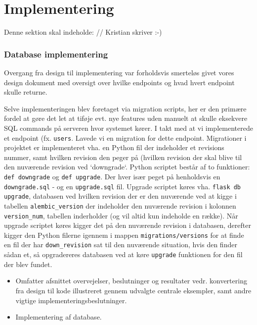 \section{Implementering}
Denne sektion skal indeholde:
// Kristian skriver :-)

\subsubsection{Database implementering}
Overgang fra design til implementering var forholdsvis smerteløs givet vores design dokument med oversigt over hvilke endpoints og hvad hvert endpoint skulle returne.

Selve implementeringen blev foretaget via migration scripts, her er den primære fordel at gøre det let at tiføje evt. nye features uden manuelt at skulle eksekvere SQL commands på serveren hvor systemet kører. I takt med at vi implementerede et endpoint (fx. \texttt{\/users}.
Lavede vi en migration for dette endpoint.
Migrationer i projektet er implementeret vha. en Python fil der indeholder et revisions nummer, samt hvilken revision den peger på (hvilken revision der skal blive til den nuværende revision ved `downgrade`. Python scriptet består af to funktioner: \texttt{def downgrade} og \texttt{def upgrade}. 
Der hver især peget på henholdsvis en \texttt{downgrade.sql} - og en \texttt{upgrade.sql} fil. Upgrade scriptet køres vha. \texttt{flask db upgrade}, databasen ved hvilken revision der er den nuværende ved at kigge i tabellen \texttt{alembic\_version} der indeholder den nuværende revision i kolonnen \texttt{version\_num}, tabellen inderholder (og vil altid kun indeholde en række). Når upgrade scriptet køres kigger det på den nuværende revision i databasen, derefter kigger den Python filerne igennem i mappen \texttt{migrations/versions} for at finde en fil der har \texttt{down\_revision} sat til den nuværende situation, hvis den finder sådan et, så opgradereres databasen ved at køre \texttt{upgrade} funktionen for den fil der blev fundet.


\begin{itemize}
    \item Omfatter afsnittet overvejelser, beslutninger og resultater vedr.  konvertering fra design til kode illustreret gennem udvalgte centrale eksempler, samt andre vigtige implementeringsbeslutninger. 
    \item Implementering af database.
\end{itemize}{}


